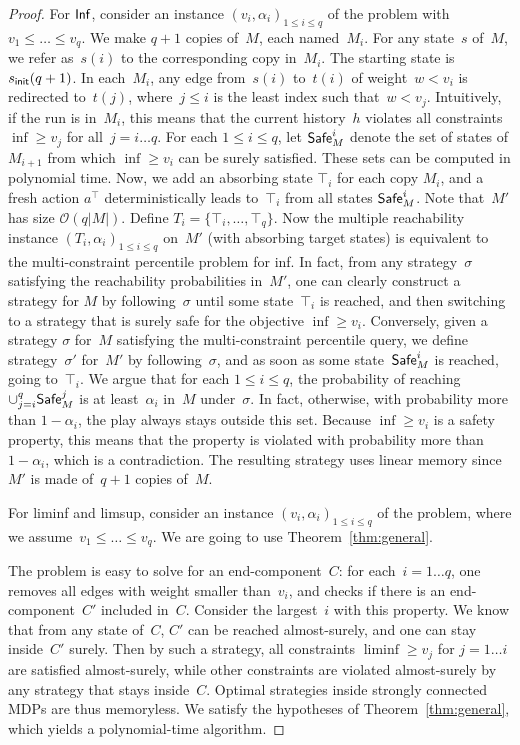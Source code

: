 \documentclass{llncs}
\newcommand{\initState}{\ensuremath{s_{{\sf init}}} }
\newcommand{\Inf}{\textrm{\sf Inf}}
\newcommand\Safe{\ensuremath{\textrm{\sf Safe}}}
\begin{document}
\begin{proof}
  For $\Inf$, consider an instance $(v_i,\alpha_i)_{1\leq i\leq q}$ of the problem with~$v_1\leq \ldots\leq v_q$.
  We make $q+1$ copies of~$M$, each named~$M_i$. For any state~$s$ of~$M$, we refer as~$s(i)$ to the corresponding copy in~$M_i$.
  The starting state is~$\initState(q+1)$.
  In each~$M_i$, any edge from~$s(i)$ to~$t(i)$ 
  of weight~$w < v_i$ is redirected to~$t(j)$, where~$j\leq i$ is the least index such that~$w < v_j$.
  Intuitively, if the run is in~$M_i$, this means that the current history~$h$ violates all constraints $\inf\geq v_j$ for all~$j=i\ldots q$.  
  For each $1\leq i\leq q$, let $\Safe_M^i$ denote the set of states of $M_{i+1}$ from which $\inf\geq v_i$ can be surely satisfied.
  These sets can be computed in polynomial time.
  Now, we add an absorbing state $\top_i$ for each copy $M_i$, and a fresh action $a^\top$ deterministically leads to~$\top_i$ from all states $\Safe_M^i$.
  Note that~$M'$ has size $\mathcal{O}(q|M|)$. Define $T_i = \{\top_i,\ldots,\top_q\}$.
  Now the multiple reachability instance $(T_i,\alpha_i)_{1\leq i\leq q}$ on~$M'$ (with absorbing target states) is equivalent to 
  the multi-constraint percentile problem for inf. In fact, from any strategy~$\sigma$ satisfying the reachability probabilities in~$M'$, one can clearly construct
  a strategy for $M$ by following~$\sigma$ until some state~$\top_i$ is reached, and then switching to a strategy that is surely safe for the objective $\inf\geq v_i$.
  Conversely, given a strategy $\sigma$ for~$M$ satisfying the multi-constraint percentile query, we define strategy~$\sigma'$ for~$M'$ by following~$\sigma$, and as soon as
  some state~$\Safe_M^i$ is reached, going to~$\top_i$. We argue that for each $1\leq i\leq q$, the probability of reaching $\cup_{j=i}^q \Safe_M^j$ is at least~$\alpha_i$
  in~$M$ under~$\sigma$.
  In fact, otherwise, with probability more than $1-\alpha_i$, the play always stays outside this set. Because $\inf\geq v_i$ is a safety property, this means that 
  the property is violated with probability more than $1-\alpha_i$, which is a contradiction.
  The resulting strategy uses linear memory since $M'$ is made of~$q+1$ copies of~$M$.

  
  For liminf and limsup, consider an instance $(v_i,\alpha_i)_{1\leq i\leq q}$ of the problem, where we assume~$v_1\leq \ldots\leq v_q$.
  We are going to use Theorem~\ref{thm:general}.

  The problem is easy to solve for an end-component~$C$: for each~$i=1\ldots q$, one removes all edges with weight smaller than~$v_i$, and checks 
  if there is an end-component~$C'$ included in~$C$. Consider the largest~$i$ with this property. We know that from any state of~$C$,
  $C'$ can be reached almost-surely, and one can stay inside~$C'$ surely. Then by such a strategy, all constraints
  $\liminf\geq v_j$ for $j=1\ldots i$ are satisfied almost-surely, 
  while other constraints are violated almost-surely by any strategy that stays inside~$C$.
  Optimal strategies inside strongly connected MDPs are thus memoryless.
  We satisfy the hypotheses of Theorem~\ref{thm:general},
  which yields a polynomial-time algorithm.


\end{proof}
\end{document}
